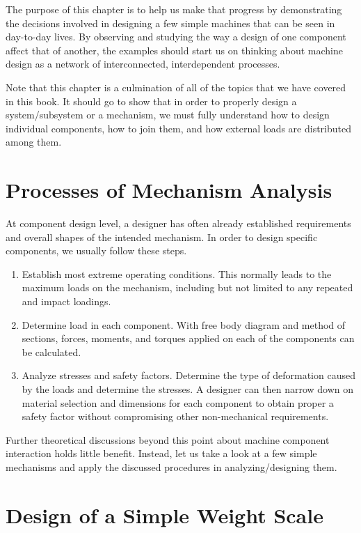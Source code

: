 \documentclass[
10pt,
a4paper,
openany,
svgnames,
]{book}
\begin{document}
The purpose of this chapter is to help us make that progress by demonstrating the decisions involved in designing a few simple machines that can be seen in day-to-day lives. By observing and studying the way a design of one component affect that of another, the examples should start us on thinking about machine design as a network of interconnected, interdependent processes.

Note that this chapter is a culmination of all of the topics that we have covered in this book. It should go to show that in order to properly design a system/subsystem or a mechanism, we must fully understand how to design individual components, how to join them, and how external loads are distributed among them.

\section{Processes of Mechanism Analysis}

At component design level, a designer has often already established requirements and overall shapes of the intended mechanism. In order to design specific components, we usually follow these steps.
\begin{enumerate}
\item Establish most extreme operating conditions. This normally leads to the maximum loads on the mechanism, including but not limited to any repeated and impact loadings.
\item Determine load in each component. With free body diagram and method of sections, forces, moments, and torques applied on each of the components can be calculated.
\item Analyze stresses and safety factors. Determine the type of deformation caused by the loads and determine the stresses. A designer can then narrow down on material selection and dimensions for each component to obtain proper a safety factor without compromising other non-mechanical requirements.
\end{enumerate}
Further theoretical discussions beyond this point about machine component interaction holds little benefit. Instead, let us take a look at a few simple mechanisms and apply the discussed procedures in analyzing/designing them. 

\section{Design of a Simple Weight Scale}
\end{document}
